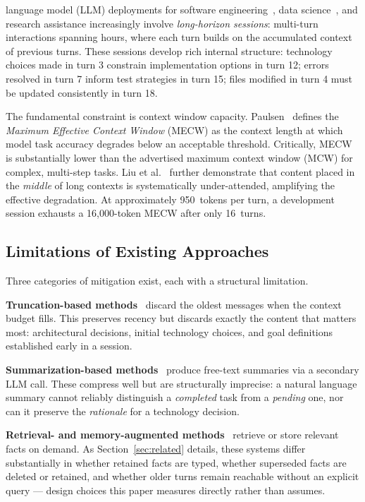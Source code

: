 \documentclass[journal]{IEEEtran}
\begin{document}
 language model (LLM) deployments for
software engineering~\cite{sweagent,copilot}, data
science~\cite{housurvey}, and research assistance increasingly
involve \emph{long-horizon sessions}: multi-turn interactions
spanning hours, where each turn builds on the accumulated
context of previous turns.
These sessions develop rich internal structure: technology
choices made in turn 3 constrain implementation options in
turn 12; errors resolved in turn 7 inform test strategies in
turn 15; files modified in turn 4 must be updated consistently
in turn 18.

The fundamental constraint is context window capacity.
Paulsen~\cite{paulsen2025} defines the \emph{Maximum Effective
Context Window} (MECW) as the context length at which model
task accuracy degrades below an acceptable threshold.
Critically, MECW is substantially lower than the advertised
maximum context window (MCW) for complex, multi-step tasks.
Liu et al.~\cite{lostmiddle} further demonstrate that content
placed in the \emph{middle} of long contexts is systematically
under-attended, amplifying the effective degradation.
At approximately 950~tokens per turn, a development session
exhausts a 16{,}000-token MECW after only 16~turns.

\subsection{Limitations of Existing Approaches}

Three categories of mitigation exist, each with a structural
limitation.

\textbf{Truncation-based methods}~\cite{brownfewshot} discard
the oldest messages when the context budget fills.
This preserves recency but discards exactly the content
that matters most: architectural decisions, initial technology
choices, and goal definitions established early in a session.

\textbf{Summarization-based methods}~\cite{langchain}
produce free-text summaries via a secondary LLM call.
These compress well but are structurally imprecise: a natural
language summary cannot reliably distinguish a \emph{completed}
task from a \emph{pending} one, nor can it preserve the
\emph{rationale} for a technology decision.

\textbf{Retrieval- and memory-augmented methods}~\cite{rag,memgpt,mem0,zep}
retrieve or store relevant facts on demand.
As Section~\ref{sec:related} details, these systems differ
substantially in whether retained facts are typed, whether
superseded facts are deleted or retained, and whether older
turns remain reachable without an explicit query --- design
choices this paper measures directly rather than assumes.
\end{document}
